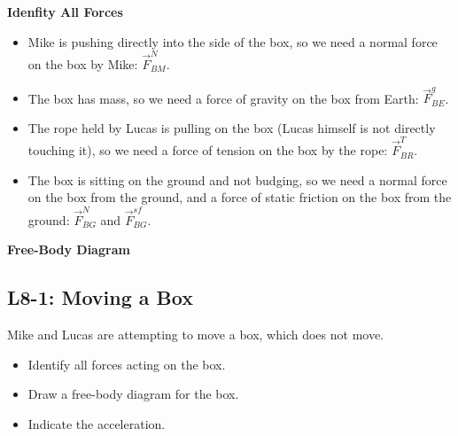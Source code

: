 \documentclass[]{article}
\begin{document}
\newpage
\begin{TeacherMargin}
\noindent\textbf{Idenfity All Forces}
\begin{itemize}
	\item Mike is pushing directly into the side of the box, so we need a normal force on the box by Mike: $\vec{F}^{N}_{BM}$.
	\item The box has mass, so we need a force of gravity on the box from Earth: $\vec{F}^{g}_{BE}$.
	\item The rope held by Lucas is pulling on the box (Lucas himself is not directly touching it), so we need a force of tension on the box by the rope: $\vec{F}^{T}_{BR}$.
	\item The box is sitting on the ground and not budging, so we need a normal force on the box from the ground, and a force of static friction on the box from the ground: $\vec{F}^{N}_{BG}$ and $\vec{F}^{sf}_{BG}$.
\end{itemize}
\noindent\textbf{Free-Body Diagram}
\begin{center}
\end{center}
\end{TeacherMargin}
\begin{PresentSpace}
\vspace{-10pt}
\section*{L8-1: Moving a Box}
\vspace{100pt}
Mike and Lucas are attempting to move a box, which does not move.
\begin{itemize}
	\item Identify all forces acting on the box.
	\item Draw a free-body diagram for the box.
	\item Indicate the acceleration.
\end{itemize}
\end{PresentSpace}
\end{document}
